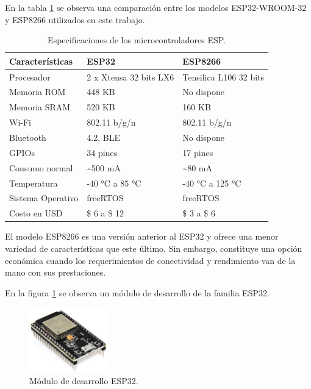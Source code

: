 En la tabla \ref{tab:esp} se observa una comparación entre los modelos ESP32-WROOM-32 y ESP8266 utilizados en este trabajo.





\begin{table}[h]
\centering
\caption[Especificaciones de los microcontroladores ESP.]{Especificaciones de los microcontroladores ESP.}

\begin{tabular} {p{4cm} p{4cm} p{4cm}} 
\toprule
\textbf{Características} & \textbf{ESP32} & \textbf{ESP8266} \\
\midrule
Procesador		& 2 x Xtensa 32 bits LX6	& Tensilica L106 32 bits\\
Memoria ROM	 	& 448 KB	& No dispone\\	
Memoria SRAM	& 520 KB	& 160 KB\\
Wi-Fi			& 802.11 b/g/n & 802.11 b/g/n\\
Bluetooth		& 4.2, BLE & No dispone\\
GPIOs			& 34 pines & 17 pines\\
Consumo normal	& \textasciitilde 500 mA & \textasciitilde 80 mA \\
Temperatura		& -40 °C a 85 °C & -40 °C a 125 °C \\
Sistema Operativo &	freeRTOS	& freeRTOS \\
Costo en USD	& \$ 6 a \$ 12  & \$ 3 a  \$ 6 \\
\bottomrule
\hline
\end{tabular}
\label{tab:esp}
\end{table}

El modelo ESP8266 es una versión anterior al ESP32 y ofrece una menor variedad de características que este último. Sin embargo, constituye una opción económica cuando los requerimientos de conectividad y rendimiento van de la mano con sus prestaciones.

 

En la figura \ref{fig:esp32} se observa un módulo de desarrollo de la familia ESP32.



\begin{figure}[h]
	\centering
	\includegraphics[width=0.30\textwidth]{./Figures/esp32.jpg}
	\caption[Módulo de desarrollo ESP32.]{Módulo de desarrollo ESP32.}
	\label{fig:esp32}

\end{figure}

